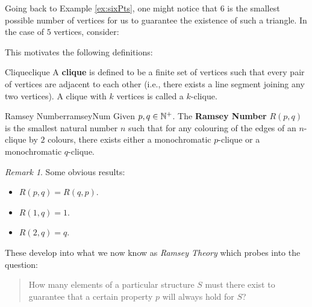 \documentclass[math]{amznotes}
\theoremstyle{remark}
\newtheorem*{remark}{Remark}
\newcommand{\0}{\mathbf{0}}
\newcommand{\1}{\mathbf{1}}
\begin{document}
Going back to Example \ref{ex:sixPts}, one might notice that $6$ is the smallest possible number of vertices for us to guarantee the existence of such a triangle. In the case of $5$ vertices, consider:
\begin{center}
\end{center}
This motivates the following definitions:
\begin{dfnbox}{Clique}{clique}
    A {\color{red} \textbf{clique}} is defined to be a finite set of vertices such that every pair of vertices are adjacent to each other (i.e., there exists a line segment joining any two vertices). A clique with $k$ vertices is called a $k$-clique.
\end{dfnbox}
\begin{dfnbox}{Ramsey Number}{ramseyNum}
    Given $p, q \in \mathbb{N}^+$. The {\color{red} \textbf{Ramsey Number}} $R(p, q)$ is the smallest natural number $n$ such that for any colouring of the edges of an $n$-clique by $2$ colours, there exists either a monochromatic $p$-clique or a monochromatic $q$-clique.
\end{dfnbox}
\begin{notebox}
    \begin{remark}
        Some obvious results:
        \begin{itemize}
            \item $R(p, q) = R(q, p)$.
            \item $R(1, q) = 1$.
            \item $R(2, q) = q$.
        \end{itemize}
    \end{remark}
\end{notebox}
These develop into what we now know as \textit{Ramsey Theory} which probes into the question:
\begin{quote}
    How many elements of a particular structure $S$ must there exist to guarantee that a certain property $p$ will always hold for $S$?
\end{quote}
\end{document}
